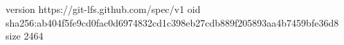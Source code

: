 version https://git-lfs.github.com/spec/v1
oid sha256:ab404f5fe9cd0fac0d6974832cd1c398eb27cdb889f205893aa4b7459bfe36d8
size 2464
